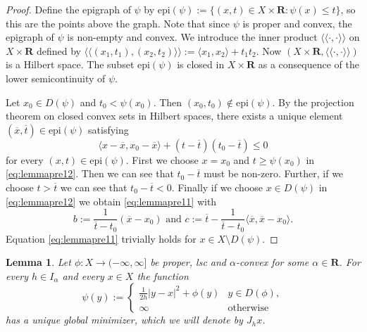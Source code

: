 \documentclass[a4paper,11pt, leqno]{scrreprt} %
\renewcommand{\leq}{\leqslant}
\renewcommand{\leq}{\leqslant}
\renewcommand{\geq}{\geqslant}
\newcommand{\R}{\mathbf R}
\newcommand{\llangle}{\langle \! \langle}
\newcommand{\rrangle}{\rangle \! \rangle}
\theoremstyle{change}
\newcounter{acounter}[chapter]
\newtheorem{lemma}[acounter]{Lemma}
\theoremstyle{nonumberplain}
\newtheorem{proof}{Proof}
\begin{document}
\begin{proof}
Define the epigraph of $\psi$ by $\text{epi}(\psi) := \{(x,t) \in X
\times \R : \psi(x) \leq t\}$, so this are the points above the
graph. Note that since $\psi$ is proper and convex, the epigraph of $\psi$ is
non-empty and convex. We introduce the inner product $\llangle \cdot,
\cdot \rrangle$ on $X \times \R$ defined by $\llangle (x_1, t_1),
(x_2, t_2) \rrangle := \langle x_1, x_2 \rangle + t_1 t_2$. Now $(X
\times \R, \llangle \cdot, \cdot \rrangle)$ is a Hilbert space. The
subset $\text{epi}(\psi)$ is closed in $X \times \R$ as a consequence
of the lower semicontinuity of $\psi$.

Let $x_0 \in D(\psi)$ and $t_0 < \psi(x_0)$. Then $(x_0, t_0) \notin
\text{epi}(\psi)$. By the projection theorem on closed convex sets in
Hilbert spaces, there exists a unique element $(\overline{x},
\overline{t}) \in \text{epi}(\psi)$ satisfying
\begin{equation}\label{eq:lemmapre12}
\langle x - \overline{x}, x_0 - \overline{x} \rangle + (t -
\overline{t})(t_0 - \overline{t}) \leq 0
\end{equation}
for every $(x, t) \in \text{epi}(\psi)$.
First we choose $x = x_0$ and $t \geq \psi(x_0)$ in
\eqref{eq:lemmapre12}. Then we can see that $t_0 - \overline{t}$ must
be non-zero. Further, if we choose $t > \overline{t}$ we can see that
$t_0 - \overline{t} < 0$. Finally if we choose $x \in D(\psi)$ in
\eqref{eq:lemmapre12} we obtain \eqref{eq:lemmapre11} with
\begin{equation*}
b := \frac{1}{\overline{t} - t_0}(\overline{x} - x_0) \text{ and } c
:= \overline{t} - \frac{1}{\overline{t} - t_0} \langle \overline{x},
\overline{x} - x_0 \rangle.
\end{equation*}
Equation \eqref{eq:lemmapre11} trivially holds for $x \in X \setminus D(\psi)$.
\end{proof}

\begin{lemma}\label{lem:prelim2}
Let $\phi : X \to (-\infty, \infty]$ be proper, lsc and
$\alpha$-convex for some $\alpha \in \R$. For every $h \in I_\alpha$
and every $x \in X$ the function
\begin{equation}\label{eq:prelim21}
\psi(y) :=
\begin{cases}
\frac{1}{2h} |y - x|^2 + \phi(y) & y \in D(\phi),\\
\infty & \text{otherwise}
\end{cases}
\end{equation}
has a unique global minimizer, which we will denote by $J_h x$.
\end{lemma}
\end{document}

